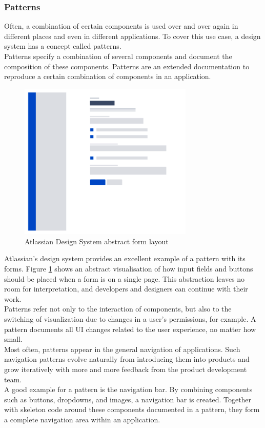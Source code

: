 \subsubsection{Patterns} \label{patterns}
Often, a combination of certain components is used over and over again in different places and even in different applications. To cover this use case, a design system has a concept called patterns.\\ 
Patterns specify a combination of several components and document the composition of these components. Patterns are an extended documentation to reproduce a certain combination of components in an application. \\
\begin{figure}[htbp]
	\centerline{\includegraphics[height=7.5cm]{images/atlassian_abstract_form.png}}
	\caption{Atlassian Design System abstract form layout \cite{atlassian_design_system_atlassian_nodate}}
	\label{atlassian_form_layout}
\end{figure}
Atlassian's design system provides an excellent example of a pattern with its forms. Figure \ref{atlassian_form_layout} shows an abstract visualisation of how input fields and buttons should be placed when a form is on a single page. This abstraction leaves no room for interpretation, and developers and designers can continue with their work. \\
Patterns refer not only to the interaction of components, but also to the switching of visualization due to changes in a user's permissions, for example. A pattern documents all \ac{UI} changes related to the user experience, no matter how small. \cite{vesselov_building_2019} \\
Most often, patterns appear in the general navigation of applications. Such navigation patterns evolve naturally from introducing them into products and grow iteratively with more and more feedback from the product development team.\\
A good example for a pattern is the navigation bar. By combining components such as buttons, dropdowns, and images, a navigation bar is created. Together with skeleton code around these components documented in a pattern, they form a complete navigation area within an application. 
